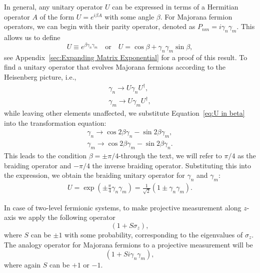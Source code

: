 \documentclass{article}
\begin{document}
In general, any unitary operator $ U $ can be expressed in terms of a Hermitian operator $ A $ of the form $ U = e^{i\beta A} $ with some angle $ \beta $. For Majorana fermion operators, we can begin with their parity operator, denoted as $ P_{nm} = i \gamma_n \gamma_m $. This allows us to define
\begin{equation}
	U \equiv e^{\beta \gamma_n \gamma_m} \quad \text{or} \quad U = \cos{\beta} + \gamma_n \gamma_m \sin{\beta},
	\label{eq:U in beta}
\end{equation}
see Appendix~\ref{sec:Expanding Matrix Exponential} for a proof of this result. To find a unitary operator that evolves Majorana fermions according to the Heisenberg picture, i.e.,
$$
	\begin{aligned}
		\gamma_n \rightarrow U \gamma_n U ^\dagger, \\
		\gamma_m \rightarrow U \gamma_m U ^\dagger,
	\end{aligned}
$$
while leaving other elements unaffected, we substitute Equation~\ref{eq:U in beta} into the transformation equation:
$$
	\begin{aligned}
		\gamma_n \rightarrow \cos{2 \beta} \gamma_n - \sin{2 \beta} \gamma_m, \\
		\gamma_m \rightarrow \cos{2 \beta} \gamma_m - \sin{2 \beta} \gamma_n.
		\label{eq:subst in transformation}
	\end{aligned}
$$
This leads to the condition $ \beta = \pm \pi / 4 $-through the text, we will refer to $ \pi /4 $ as the braiding operator and $ -\pi /4 $ the inverse braiding operator. Substituting this into the expression, we obtain the braiding unitary operator for $ \gamma_n $ and $ \gamma_m $:
$$
	\begin{aligned}
		U = \exp \left( \pm \frac{\pi}{4} \gamma_n \gamma_m\right) = \frac{1}{\sqrt{2}}\left(1 \pm \gamma_n \gamma_m\right).
	\end{aligned}
$$

In case of two-level fermionic systems, to make projective measurement along $ z $-axis we apply the following operator
\begin{equation*}
	(1 + S \sigma_z),
\end{equation*}
where $ S $ can be $ \pm 1 $ with some probability, corresponding to the eigenvalues of $ \sigma_z $. The analogy operator for Majorana fermions to a projective measurement will be
\[
	(1 + S i \gamma_n \gamma_m),
\]
where again $ S $ can be $ +1 $ or $ -1 $.
\end{document}
